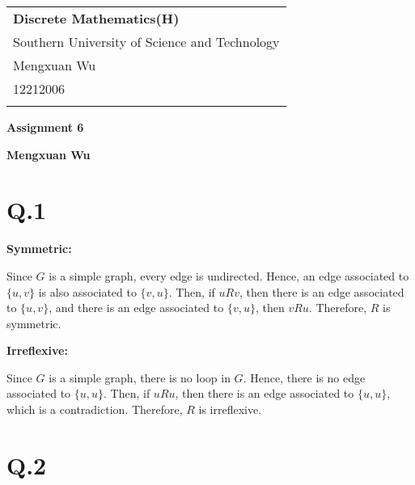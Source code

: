 \documentclass[a4paper,12pt]{article}
\begin{document}
\thispagestyle{empty} %

\begin{tabular}{p{15.5cm}}
{\large \bf Discrete Mathematics(H)} \\
Southern University of Science and Technology \\ Mengxuan Wu \\ 12212006 \\
\hline
\\
\end{tabular}

\vspace*{0.3cm} %

\begin{center}
	{\Large \bf Assignment 6}
	\vspace{2mm}

	{\bf Mengxuan Wu}
		
\end{center}  

\vspace{0.4cm}

\section*{Q.1}

\textbf{Symmetric:}

Since $G$ is a simple graph, every edge is undirected.
Hence, an edge associated to $\{u,v\}$ is also associated to $\{v,u\}$.
Then, if $uRv$, then there is an edge associated to $\{u,v\}$, and there is an edge associated to $\{v,u\}$, then $vRu$.
Therefore, $R$ is symmetric.

\textbf{Irreflexive:}

Since $G$ is a simple graph, there is no loop in $G$.
Hence, there is no edge associated to $\{u,u\}$.
Then, if $uRu$, then there is an edge associated to $\{u,u\}$, which is a contradiction.
Therefore, $R$ is irreflexive.

\section*{Q.2}
\end{document}
